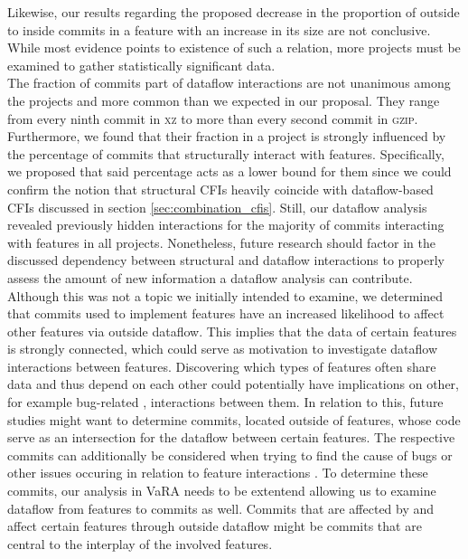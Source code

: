 Likewise, our results regarding the proposed decrease in the proportion of outside to inside commits in a feature with an increase in its size are not conclusive.
While most evidence points to existence of such a relation, more projects must be examined to gather statistically significant data. \\
The fraction of commits part of dataflow interactions are not unanimous among the projects and more common than we expected in our proposal.
They range from every ninth commit in \textsc{xz} to more than every second commit in \textsc{gzip}.
Furthermore, we found that their fraction in a project is strongly influenced by the percentage of commits that structurally interact with features.
Specifically, we proposed that said percentage acts as a lower bound for them since we could confirm the notion that structural CFIs heavily coincide with dataflow-based CFIs discussed in section \ref{sec:combination_cfis}.
Still, our dataflow analysis revealed previously hidden interactions for the majority of commits interacting with features in all projects.
Nonetheless, future research should factor in the discussed dependency between structural and dataflow interactions to properly assess the amount of new information a dataflow analysis can contribute. \\
Although this was not a topic we initially intended to examine, we determined that commits used to implement features have an increased likelihood to affect other features via outside dataflow.
This implies that the data of certain features is strongly connected, which could serve as motivation to investigate dataflow interactions between features.
Discovering which types of features often share data and thus depend on each other could potentially have implications on other, for example bug-related \cite{nie2011survey}, interactions between them.
In relation to this, future studies might want to determine commits, located outside of features, whose code serve as an intersection for the dataflow between certain features.
The respective commits can additionally be considered when trying to find the cause of bugs or other issues occuring in relation to feature interactions \cite{apel2014feature}.
To determine these commits, our analysis in VaRA needs to be extentend allowing us to examine dataflow from features to commits as well.
Commits that are affected by and affect certain features through outside dataflow might be commits that are central to the interplay of the involved features. \\
